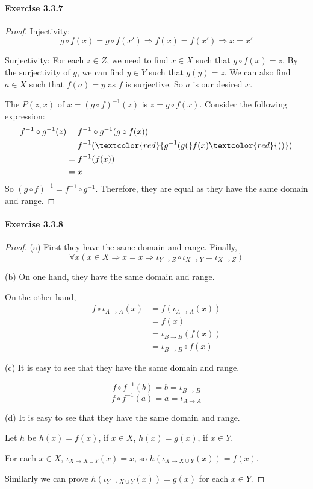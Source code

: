 \paragraph{Exercise 3.3.7} \label{exercise3.3.7}
\begin{proof}
Injectivity: 
\[
g \circ f(x) = g \circ f(x') \Longrightarrow f(x) = f(x') \Longrightarrow x = x'
\]

Surjectivity:
For each $z \in Z$, we need to find $x \in X$ such that $g \circ f(x) = z$. By the surjectivity of $g$, 
we can find $y \in Y$ such that $g(y) = z$. We can also find $a \in X$ such that $f(a) = y$ as $f$ is 
surjective. So $a$ is our desired $x$.

The $P(z,x)$ of $x = (g \circ f)^{-1}(z)$ is $z = g \circ f(x)$. Consider the following expression:
\begin{align*}
f^{-1} \circ g^{-1} (z)
&= f^{-1} \circ g^{-1} (g \circ f(x)) \\
&= f^{-1}(\textcolor{red}{g^{-1}(g(}f(x)\textcolor{red}{))}) \\
&= f^{-1}(f(x)) \\
&= x
\end{align*}
So $(g \circ f)^{-1} = f^{-1} \circ g^{-1}$. Therefore, they are equal as they have the same domain and 
range.
\end{proof}

\paragraph{Exercise 3.3.8} \label{exercise3.3.8}
\begin{proof}
(a) First they have the same domain and range. Finally, 
\[
\forall x(x\in X \Longrightarrow x=x \Longrightarrow \iota_{Y \rightarrow Z} \circ 
\iota_{X \rightarrow Y} = \iota_{X \rightarrow Z})
\]

(b) On one hand, they have the same domain and range.

On the other hand, 
\begin{align*}
f \circ \iota_{A \rightarrow A}(x) 
&= f(\iota_{A \rightarrow A}(x)) \\
&= f(x) \\
&= \iota_{B \rightarrow B}(f(x)) \\
&= \iota_{B \rightarrow B} \circ f (x)
\end{align*}

(c) It is easy to see that they have the same domain and range. 

\[
f \circ f^{-1} (b) = b = \iota_{B \rightarrow B}
\]
\[
f \circ f^{-1} (a) = a = \iota_{A \rightarrow A}
\]

(d) It is easy to see that they have the same domain and range.

Let $h$ be 
$h(x) = f(x)$, if $x \in X$, $h(x) = g(x)$, if $x \in Y$. 

For each $x \in X$, $\iota_{X \rightarrow X \cup Y}(x) = x$, so 
$h(\iota_{X \rightarrow X \cup Y}(x)) =f(x)$.

Similarly we can prove $h(\iota_{Y \rightarrow X \cup Y}(x)) = g(x)$ for each $x \in Y$.
\end{proof}

